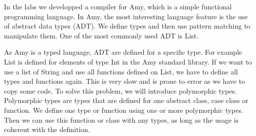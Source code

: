In the labs we developped a compiler for Amy, which is a simple functional programming language. In Amy, the most interesting language feature is the use of abstract data types (ADT). We define types and then use pattern matching to manipulate them. One of the most commonly used ADT is List. 

As Amy is a typed language, ADT are defined for a specific type. For example List is defined for elements of type Int in the Amy standard library. If we want to use a list of String and use all functions defined on List, we have to define all types and functions again. This is very slow and is prone to error as we have to copy some code. To solve this problem, we will introduce polymorphic types. Polymorphic types are types that are defined for one abstract class, case class or function. We define one type or function using one or more polymorphic types. Then we can use this function or class with any types, as long as the usage is coherent with the definition.
